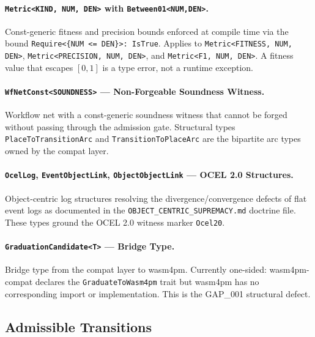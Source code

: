 \paragraph{\texttt{Metric\textless{}KIND, NUM, DEN\textgreater{}} with \texttt{Between01\textless{}NUM,DEN\textgreater{}}.}
Const-generic fitness and precision bounds enforced at compile time via the bound
\texttt{Require\textless{}\{NUM <= DEN\}\textgreater{}: IsTrue}. Applies to
\texttt{Metric\textless{}FITNESS, NUM, DEN\textgreater{}},
\texttt{Metric\textless{}PRECISION, NUM, DEN\textgreater{}}, and
\texttt{Metric\textless{}F1, NUM, DEN\textgreater{}}. A fitness value that escapes $[0,1]$
is a type error, not a runtime exception.

\paragraph{\texttt{WfNetConst\textless{}SOUNDNESS\textgreater{}} --- Non-Forgeable Soundness Witness.}
Workflow net with a const-generic soundness witness that cannot be forged without passing
through the admission gate. Structural types \texttt{PlaceToTransitionArc} and
\texttt{TransitionToPlaceArc} are the bipartite arc types owned by the compat layer.

\paragraph{\texttt{OcelLog}, \texttt{EventObjectLink}, \texttt{ObjectObjectLink} --- OCEL 2.0 Structures.}
Object-centric log structures resolving the divergence/convergence defects of flat event logs
as documented in the \texttt{OBJECT\_CENTRIC\_SUPREMACY.md} doctrine file. These types
ground the OCEL 2.0 witness marker \texttt{Ocel20}.

\paragraph{\texttt{GraduationCandidate\textless{}T\textgreater{}} --- Bridge Type.}
Bridge type from the compat layer to wasm4pm. Currently one-sided: wasm4pm-compat declares
the \texttt{GraduateToWasm4pm} trait but wasm4pm has no corresponding import or
implementation. This is the GAP\_001 structural defect.

\subsection{Admissible Transitions}
\label{sec:doctrine-architecture-transitions}

